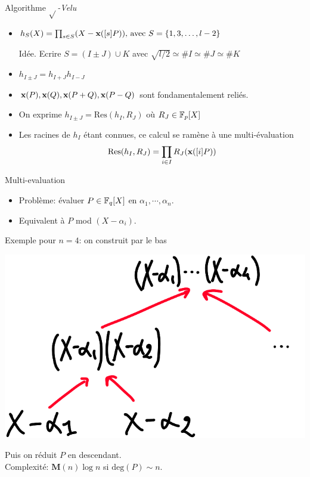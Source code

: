 \documentclass{beamer}
\begin{document}
\begin{frame}[fragile]{Algorithme $\sqrt{}$\textit{-Velu}}
	\begin{itemize}
		\item{$h_S(X) = \prod_{s\in S}(X-\textbf{x}([s]P))\text{, avec }S=\{1,3, \ldots, l-2\}$}
		\item[Idée.] {Ecrire $S=(I\pm J) \cup K$} avec $\sqrt{l/2}\simeq \#I \simeq \#J \simeq \#K$
		\item{$h_{I\pm J} = h_{I+J} h_{I-J}$}
		\item{$\textbf{x}(P), \textbf{x}(Q), \textbf{x}(P+Q), \textbf{x}(P-Q)$ sont fondamentalement reliés.}
		\item{On exprime $h_{I\pm J}=\text{Res}(h_I, R_J)$ où $R_J\in\mathbb{F}_p[X]$}
		\item{Les racines de $h_I$ étant connues, ce calcul se ramène à une multi-évaluation
			\[\text{Res}(h_I, R_J)=\prod_{i\in I}R_J(\textbf{x}([i]P))\]}
	\end{itemize}
\end{frame}

\begin{frame}{Multi-evaluation}
	\begin{itemize}
		\item Probl\`eme:  \'evaluer $P\in\mathbb{F}_q[X]$ en $\alpha_1,\cdots, \alpha_n$.
		\item Equivalent \`a $P$ mod $(X-\alpha_i)$.
	\end{itemize}
	Exemple pour $n=4$: on construit par le bas
	\begin{center}
		\includegraphics[scale=0.2]{../figs/tree}
	\end{center}
	Puis on r\'eduit $P$ en descendant.\\
	Complexit\'e: $\mathbf{M}(n)\log n$ si $\text{deg}(P) \sim n$.
\end{frame}
\end{document}
